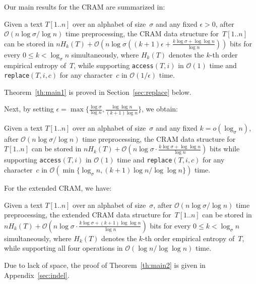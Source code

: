 \documentclass{llncs}
\newcommand{\Order}{\mathcal{O}}
\newcommand{\order}{o}
\begin{document}
\smallskip

Our main results for the CRAM are summarized in:
\begin{theorem}\label{th:main1}
Given a text $T[1..n]$ over an alphabet of size~$\sigma$
and any fixed $\epsilon > 0$,
after $\Order(n\log\sigma/\log n)$ time preprocessing,
the CRAM data structure for~$T[1..n]$ can be stored in
$nH_k(T)+\Order\left(n\log\sigma \left((k+1)\epsilon + \frac{k\log\sigma+\log\log n}{\log n}\right)\right)$ bits
for every $0 \le k < \log_\sigma n$ simultaneously,
where $H_k(T)$ denotes the $k$-th order empirical entropy of~$T$,
while supporting \textnormal{\texttt{access}}$(T,i)$ in $\Order(1)$ time
and \textnormal{\texttt{replace}}$(T,i,c)$ for any character~$c$
in $\Order(1/\epsilon)$ time.
\end{theorem}

Theorem~\ref{th:main1} is proved in Section~\ref{sec:replace} below.

Next, by setting
$\epsilon = \max\{\frac{\log \sigma}{\log n}, \frac{\log\log n}{(k+1)\log n} \}$,
we obtain:
\begin{corollary}
Given a text $T[1..n]$ over an alphabet of size~$\sigma$
and any fixed $k = \order(\log_\sigma n)$,
after $\Order(n\log\sigma/\log n)$ time preprocessing,
the CRAM data structure for~$T[1..n]$ can be stored in
$nH_k(T)+\Order\left(n\log\sigma \cdot \frac{k\log\sigma+\log\log n}{\log n}\right)$ bits
while supporting \textnormal{\texttt{access}}$(T,i)$ in $\Order(1)$ time and
\textnormal{\texttt{replace}}$(T,i,c)$ for any character~$c$
in $\Order(\min\{\log_\sigma n, (k+1)\log n/\log\log n\})$ time.
\end{corollary}


\smallskip

For the extended CRAM, we have:
\begin{theorem}\label{th:main2}
Given a text $T[1..n]$ over an alphabet of size~$\sigma$,
after $\Order(n\log\sigma/\log n)$ time preprocessing,
the extended CRAM data structure for~$T[1..n]$ can be stored in
$nH_k(T)+\Order\left(n\log\sigma \cdot \frac{k\log\sigma+(k+1)\log\log n}{\log n}\right)$ bits
for every $0 \le k < \log_\sigma n$ simultaneously,
where $H_k(T)$ denotes the $k$-th order empirical entropy of~$T$,
while supporting all four operations in $\Order(\log n/\log\log n)$ time.
\end{theorem}

Due to lack of space, the proof of
Theorem~\ref{th:main2} is given in Appendix~\ref{sec:indel}.


\medskip
\end{document}
